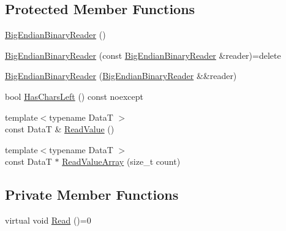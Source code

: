 \subsection*{Protected Member Functions}
\begin{DoxyCompactItemize}
\item 
\hyperlink{classmage_1_1_big_endian_binary_reader_a1fd0dbee6950a8cb04aa399f0cdbaf2a}{Big\+Endian\+Binary\+Reader} ()
\item 
\hyperlink{classmage_1_1_big_endian_binary_reader_a9d490263268290217ae4f2f06e0699c4}{Big\+Endian\+Binary\+Reader} (const \hyperlink{classmage_1_1_big_endian_binary_reader}{Big\+Endian\+Binary\+Reader} \&reader)=delete
\item 
\hyperlink{classmage_1_1_big_endian_binary_reader_a3cb2fbd205854cf69c36054a2003e80e}{Big\+Endian\+Binary\+Reader} (\hyperlink{classmage_1_1_big_endian_binary_reader}{Big\+Endian\+Binary\+Reader} \&\&reader)
\item 
bool \hyperlink{classmage_1_1_big_endian_binary_reader_adaa45913c50d4cb54456121ba56c8afb}{Has\+Chars\+Left} () const noexcept
\item 
{\footnotesize template$<$typename DataT $>$ }\\const DataT \& \hyperlink{classmage_1_1_big_endian_binary_reader_a036399c5d3099a4e617127acb110ccdf}{Read\+Value} ()
\item 
{\footnotesize template$<$typename DataT $>$ }\\const DataT $\ast$ \hyperlink{classmage_1_1_big_endian_binary_reader_aa79d97deb6060a6c1015c8f2891ac6da}{Read\+Value\+Array} (size\+\_\+t count)
\end{DoxyCompactItemize}
\subsection*{Private Member Functions}
\begin{DoxyCompactItemize}
\item 
virtual void \hyperlink{classmage_1_1_big_endian_binary_reader_af072965dea0319d6366b21cc6562bbf9}{Read} ()=0
\end{DoxyCompactItemize}
